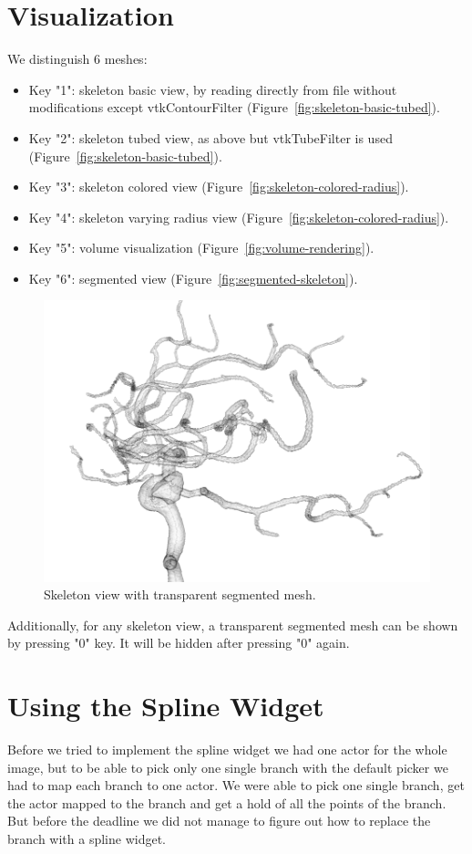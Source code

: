 \section{Visualization}

We distinguish 6 meshes:
\begin{itemize}
	\item Key "1": skeleton basic view, by reading directly from file without modifications except vtkContourFilter (Figure~\ref{fig:skeleton-basic-tubed}).
	\item Key "2": skeleton tubed view, as above but vtkTubeFilter is used (Figure~\ref{fig:skeleton-basic-tubed}).
	\item Key "3": skeleton colored view (Figure~\ref{fig:skeleton-colored-radius}).
	\item Key "4": skeleton varying radius view (Figure~\ref{fig:skeleton-colored-radius}).
	\item Key "5": volume visualization (Figure~\ref{fig:volume-rendering}).
	\item Key "6": segmented view (Figure~\ref{fig:segmented-skeleton}).
\end{itemize}

\begin{figure}
	\centering
	\includegraphics[scale=0.4]{fig/skeleton-transparent-segmented}
	\caption{Skeleton view with transparent segmented mesh.}
	\label{fig:skeleton-transparent-segmented}
\end{figure}

Additionally, for any skeleton view, a transparent segmented mesh can be shown by pressing "0" key. It will be hidden after pressing "0" again.

\section{Using the Spline Widget}
Before we tried to implement the spline widget we had one actor for the whole image, but to be able to pick only one single branch with the default picker we had to map each branch to one actor. We were able to pick one single branch, get the actor mapped to the branch and get a hold of all the points of the branch. But before the deadline we did not manage to figure out how to replace the branch with a spline widget.

